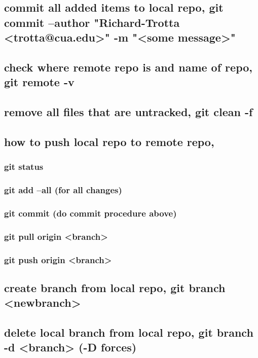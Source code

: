 \documentclass[11pt]{article}
\begin{document}
\subsection{commit all added items to local repo, git commit --author "Richard-Trotta <trotta@cua.edu>" -m "<some message>"}
\label{sec:org1f20b04}
\subsection{check where remote repo is and name of repo, git remote -v}
\label{sec:org1b820ef}
\subsection{remove all files that are untracked, git clean -f}
\label{sec:org38333c7}
\subsection{how to push local repo to remote repo,}
\label{sec:org25505fb}
\subsubsection{git status}
\label{sec:org1e5f2ef}
\subsubsection{git add --all (for all changes)}
\label{sec:org2ad53da}
\subsubsection{git commit (do commit procedure above)}
\label{sec:org5cb9f90}
\subsubsection{git pull origin <branch>}
\label{sec:org5ab92e4}
\subsubsection{git push origin <branch>}
\label{sec:orga69771e}
\subsection{create branch from local repo, git branch <newbranch>}
\label{sec:org422ac62}
\subsection{delete local branch from local repo, git branch -d <branch> (-D forces)}
\label{sec:org8838993}
\end{document}
